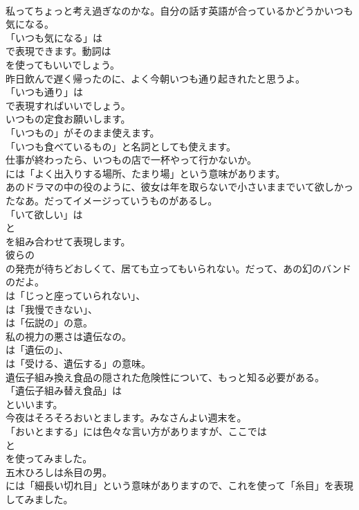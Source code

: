 \documentclass[8pt]{extreport}
\begin{document}
\begin{CJK}{UTF8}{min}
\\	私ってちょっと考え過ぎなのかな。自分の話す英語が合っているかどうかいつも気になる。 
\\	「いつも気になる」は 
\\	で表現できます。動詞は 
\\	を使ってもいいでしょう。	
\\	昨日飲んで遅く帰ったのに、よく今朝いつも通り起きれたと思うよ。 
\\	「いつも通り」は
\\	で表現すればいいでしょう。	
\\	いつもの定食お願いします。 
\\	「いつもの」がそのまま使えます。
\\	「いつも食べているもの」と名詞としても使えます。	
\\	仕事が終わったら、いつもの店で一杯やって行かないか。 
\\	には「よく出入りする場所、たまり場」という意味があります。	
\\	あのドラマの中の役のように、彼女は年を取らないで小さいままでいて欲しかったなあ。だってイメージっていうものがあるし。 
\\	「いて欲しい」は
\\	と
\\	を組み合わせて表現します。	
\\	彼らの
\\	の発売が待ちどおしくて、居ても立ってもいられない。だって、あの幻のバンドのだよ。 
\\	は「じっと座っていられない」、
\\	は「我慢できない」、
\\	は「伝説の」の意。	
\\	私の視力の悪さは遺伝なの。 
\\	は「遺伝の」、
\\	は「受ける、遺伝する」の意味。	
\\	遺伝子組み換え食品の隠された危険性について、もっと知る必要がある。 
\\	「遺伝子組み替え食品」は
\\	といいます。	
\\	今夜はそろそろおいとまします。みなさんよい週末を。 
\\	「おいとまする」には色々な言い方がありますが、ここでは
\\	と
\\	を使ってみました。	
\\	五木ひろしは糸目の男。 
\\	には「細長い切れ目」という意味がありますので、これを使って「糸目」を表現してみました。	

\end{CJK}
\end{document}
